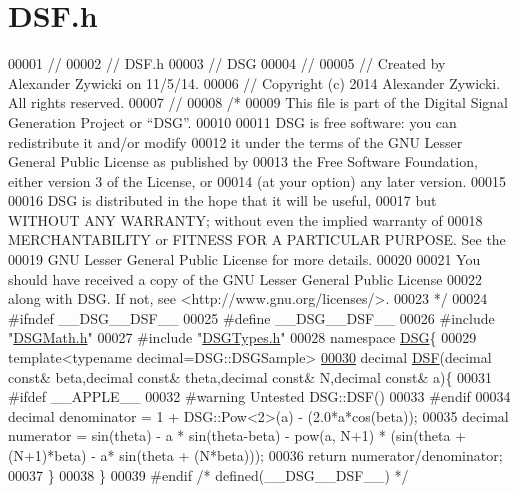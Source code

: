 \hypertarget{_d_s_f_8h_source}{\section{D\+S\+F.\+h}
\label{_d_s_f_8h_source}
}

\begin{DoxyCode}
00001 \textcolor{comment}{//}
00002 \textcolor{comment}{//  DSF.h}
00003 \textcolor{comment}{//  DSG}
00004 \textcolor{comment}{//}
00005 \textcolor{comment}{//  Created by Alexander Zywicki on 11/5/14.}
00006 \textcolor{comment}{//  Copyright (c) 2014 Alexander Zywicki. All rights reserved.}
00007 \textcolor{comment}{//}
00008 \textcolor{comment}{/*}
00009 \textcolor{comment}{ This file is part of the Digital Signal Generation Project or “DSG”.}
00010 \textcolor{comment}{}
00011 \textcolor{comment}{ DSG is free software: you can redistribute it and/or modify}
00012 \textcolor{comment}{ it under the terms of the GNU Lesser General Public License as published by}
00013 \textcolor{comment}{ the Free Software Foundation, either version 3 of the License, or}
00014 \textcolor{comment}{ (at your option) any later version.}
00015 \textcolor{comment}{}
00016 \textcolor{comment}{ DSG is distributed in the hope that it will be useful,}
00017 \textcolor{comment}{ but WITHOUT ANY WARRANTY; without even the implied warranty of}
00018 \textcolor{comment}{ MERCHANTABILITY or FITNESS FOR A PARTICULAR PURPOSE.  See the}
00019 \textcolor{comment}{ GNU Lesser General Public License for more details.}
00020 \textcolor{comment}{}
00021 \textcolor{comment}{ You should have received a copy of the GNU Lesser General Public License}
00022 \textcolor{comment}{ along with DSG.  If not, see <http://www.gnu.org/licenses/>.}
00023 \textcolor{comment}{ */}
00024 \textcolor{preprocessor}{#ifndef \_\_DSG\_\_DSF\_\_}
00025 \textcolor{preprocessor}{#define \_\_DSG\_\_DSF\_\_}
00026 \textcolor{preprocessor}{#include "\hyperlink{_d_s_g_math_8h}{DSGMath.h}"}
00027 \textcolor{preprocessor}{#include "\hyperlink{_d_s_g_types_8h}{DSGTypes.h}"}
00028 \textcolor{keyword}{namespace }\hyperlink{namespace_d_s_g}{DSG}\{
00029     \textcolor{keyword}{template}<\textcolor{keyword}{typename} decimal=DSG::DSGSample>
\hypertarget{_d_s_f_8h_source_l00030}{}\hyperlink{namespace_d_s_g_aac6959add6359f512191ddcd17fd6373}{00030}     decimal \hyperlink{namespace_d_s_g_aac6959add6359f512191ddcd17fd6373}{DSF}(decimal \textcolor{keyword}{const}& beta,decimal \textcolor{keyword}{const}& theta,decimal \textcolor{keyword}{const}& N,decimal \textcolor{keyword}{const}& a)\{
00031 \textcolor{preprocessor}{#ifdef \_\_APPLE\_\_}
00032 \textcolor{preprocessor}{#warning Untested DSG::DSF()}
00033 \textcolor{preprocessor}{#endif}
00034         decimal denominator = 1 + DSG::Pow<2>(a) - (2.0*a*cos(beta));
00035         decimal numerator = sin(theta) - a * sin(theta-beta) - pow(a, N+1) * (sin(theta + (N+1)*beta) - a*
      sin(theta + (N*beta)));
00036         \textcolor{keywordflow}{return} numerator/denominator;
00037     \}
00038 \}
00039 \textcolor{preprocessor}{#endif }\textcolor{comment}{/* defined(\_\_DSG\_\_DSF\_\_) */}\textcolor{preprocessor}{}
\end{DoxyCode}
